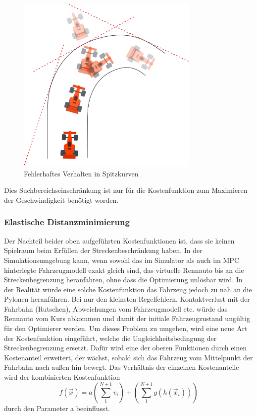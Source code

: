 \documentclass{like}
\begin{document}
\begin{figure}[ht!]
	\centering
	\includegraphics[width=250pt]{Abbildungen/curveAnomaly.png}
	\caption{Fehlerhaftes Verhalten in Spitzkurven}
	\label{fig:curveAnomaly}
\end{figure}

Dies Suchbereichseinschränkung ist nur für die Kostenfunktion zum Maximieren der Geschwindigkeit benötigt worden.

\subsubsection*{Elastische Distanzminimierung}
Der Nachteil beider oben aufgeführten Kostenfunktionen ist, dass sie keinen Spielraum beim Erfüllen der Streckenbeschränkung haben. In der Simulationsumgebung kann, wenn sowohl das im Simulator als auch im \ac{MPC} hinterlegte Fahrzeugmodell exakt gleich sind, das virtuelle Rennauto bis an die Streckenbegrenzung heranfahren, ohne dass die Optimierung unlösbar wird. In der Realität würde eine solche Kostenfunktion das Fahrzeug jedoch zu nah an die Pylonen heranführen. Bei nur den kleinsten Regelfehlern, Kontaktverlust mit der Fahrbahn (Rutschen), Abweichungen vom Fahrzeugmodell etc. würde das Rennauto vom Kurs abkommen und damit der initiale Fahrzeugzustand ungültig für den Optimierer werden. Um dieses Problem zu umgehen, wird eine neue Art der Kostenfunktion eingeführt, welche die Ungleichheitsbedingung der Streckenbegrenzung ersetzt. Dafür wird eine der oberen Funktionen durch einen Kostenanteil erweitert, der wächst, sobald sich das Fahrzeug vom Mittelpunkt der Fahrbahn nach außen hin bewegt. Das Verhältnis der einzelnen Kostenanteile wird der kombinierten Kostenfunktion  
\begin{equation}
	f(\vec{x}) = a \left(\sum_{1}^{N+1} v_i \right) + \left(\sum_{1}^{N+1} g \left(h \left(\vec{x}_i \right) \right) \right)
\end{equation}
durch den Parameter a beeinflusst. \\
\end{document}
